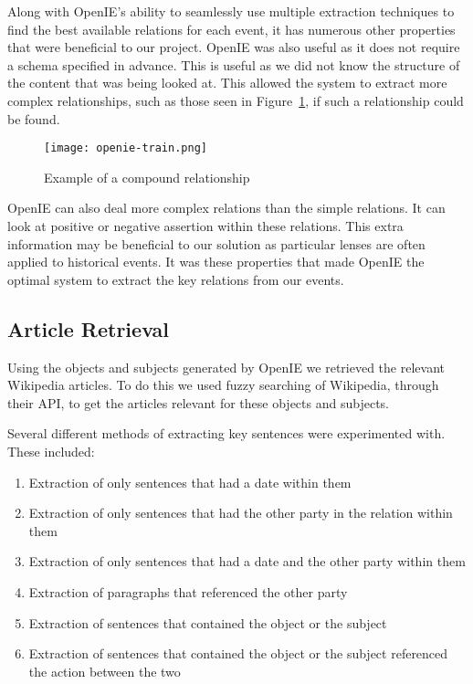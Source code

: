 \documentclass[bsc,frontabs,twoside,singlespacing,parskip,deptreport]{infthesis}     %
\begin{document}
Along with OpenIE's ability to seamlessly use multiple extraction techniques to find the best available
relations for each event, it has numerous other properties that were beneficial to our project.
OpenIE was also useful as it does not require a schema specified in advance.
This is useful as we did not know the structure of the content that was being looked at.
This allowed the system to extract
more complex relationships, such as those seen in Figure~\ref{fig:compound-relations}, if such
a relationship could be found.


\begin{figure}[H]
  \centering
  \texttt{[image: openie-train.png]}
  \caption{Example of a compound relationship \protect\cite{OpenIE}}
\label{fig:compound-relations}
  \end{figure}

OpenIE can also deal more complex relations  than the simple relations.
It can look at positive or negative assertion within these relations.
This extra information may be beneficial to our solution as particular lenses are often applied to historical events.
It was these properties that made OpenIE the optimal system to extract the key relations from our events.


\subsection{Article Retrieval}
Using the objects and subjects generated by OpenIE we retrieved the relevant Wikipedia articles.
To do this we used fuzzy searching of Wikipedia, through their API, to get the articles relevant
for these objects and subjects.

Several different methods of extracting key sentences were experimented with.
These included:

\begin{enumerate}
  \item Extraction of only sentences that had a date within them
  \item Extraction of only sentences that had the other party in the relation within them
  \item Extraction of only sentences that had a date and the other party within them
  \item Extraction of paragraphs that referenced the other party
  \item Extraction of sentences that contained the object or the subject 
  \item Extraction of sentences that contained the object or the subject referenced the action between the two 
\end{enumerate}
\end{document}
